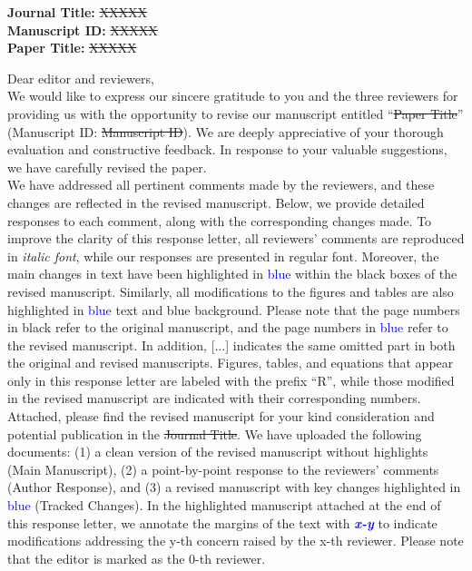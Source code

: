\makecovertitle

\noindent\textbf{Journal Title:} \sout{XXXXX} \\
\noindent\textbf{Manuscript ID:} \sout{XXXXX} \\
\noindent\textbf{Paper Title:} \sout{XXXXX}
\vspace{1cm}

\noindent Dear editor and reviewers, \\

We would like to express our sincere gratitude to you and the three reviewers for providing us with the opportunity to revise our manuscript
entitled ``\sout{Paper Title}'' (Manuscript ID: \sout{Manuscript ID}).
We are deeply appreciative of your thorough evaluation and constructive feedback.
In response to your valuable suggestions, we have carefully revised the paper. \\

We have addressed all pertinent comments made by the reviewers, and these changes are reflected in the revised manuscript.
Below, we provide detailed responses to each comment, along with the corresponding changes made.
To improve the clarity of this response letter,
all reviewers' comments are reproduced in \textit{italic font}, while our responses are presented in regular font.
Moreover, the main changes in text have been highlighted in \textcolor{blue}{blue} within the black boxes of the revised manuscript.
Similarly, all modifications to the figures and tables are also highlighted in \textcolor{blue}{blue} text and \colorbox{blue!20}{blue} background.
Please note that the page numbers in black refer to the original manuscript,
and the page numbers in \textcolor{blue}{blue} refer to the revised manuscript.
In addition, [...] indicates the same omitted part in both the original and revised manuscripts.
Figures, tables, and equations that appear only in this response letter are labeled with the prefix ``R'',
while those modified in the revised manuscript are indicated with their corresponding numbers. \\

Attached, please find the revised manuscript for your kind consideration and potential publication
in the \sout{Journal Title}. We have uploaded the following documents:
(1) a clean version of the revised manuscript without highlights (Main Manuscript),
(2) a point-by-point response to the reviewers' comments (Author Response), and
(3) a revised manuscript with key changes highlighted in \textcolor{blue}{blue} (Tracked Changes).
In the highlighted manuscript attached at the end of this response letter,
we annotate the margins of the text with \textcolor{blue}{\textbf{\textit{x-y}}}
to indicate modifications addressing the y-th concern raised by the x-th reviewer. 
Please note that the editor is marked as the 0-th reviewer. \\

